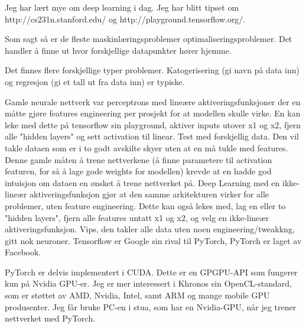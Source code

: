 Jeg har lært mye om deep learning i dag. Jeg har blitt tipset om http://cs231n.stanford.edu/ og http://playground.tensorflow.org/.

Som sagt så er de fleste maskinlæringsproblemer optimaliseringsproblemer. Det handler å finne ut hvor forskjellige datapunkter hører hjemme.

Det finnes flere forskjellige typer problemer. Katogerisering (gi navn på data inn) og regresjon (gi et tall ut fra data inn) er typiske.

Gamle neurale nettverk var perceptrons med lineære aktiveringsfunksjoner der en måtte gjøre features engineering per prosjekt for at modellen skulle virke. En kan leke med dette på tensorflow sin playground, aktiver inputs utover x1 og x2, fjern alle "hidden layers" og sett activation til linear. Test med forskjellig data. Den vil takle dataen som er i to godt avskilte skyer uten at en må tukle med features. Denne gamle måten å trene nettverkene (å finne parametere til activation featuren, for så å lage gode weights for modellen) krevde at en hadde god intuisjon om dataen en ønsket å trene nettverket på. Deep Learning med en ikke-lineær aktiveringsfunksjon gjør at den samme arkitekturen virker for alle problemer, uten feature engineering. Dette kan også lekes med, lag en eller to "hidden layers", fjern alle features untatt x1 og x2, og velg en ikke-lineær aktiveringsfunksjon. Vips, den takler alle data uten noen engineering/tweakkng, gitt nok neuroner. Tensorflow er Google sin rival til PyTorch, PyTorch er laget av Facebook.

PyTorch er delvis implementert i CUDA. Dette er en GPGPU-API som fungerer kun på Nvidia GPU-er. Jeg er mer interessert i Khronos sin OpenCL-standard, som er støttet av AMD, Nvidia, Intel, samt ARM og mange mobile GPU produsenter. Jeg får bruke PC-en i stua, som har en Nvidia-GPU, når jeg trener nettverket med PyTorch.

